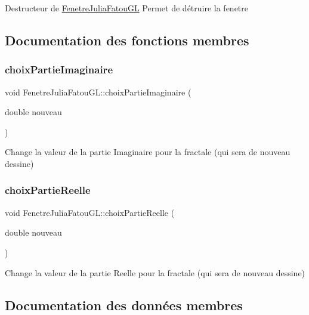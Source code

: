 Destructeur de \hyperlink{classFenetreJuliaFatouGL}{Fenetre\+Julia\+Fatou\+GL} Permet de détruire la fenetre 

\subsection{Documentation des fonctions membres}
\mbox{\label{classFenetreJuliaFatouGL_a73ccd24872ccdf2d9d6a982c0ed44d70}} 
\subsubsection{\texorpdfstring{choix\+Partie\+Imaginaire}{choixPartieImaginaire}}
{\footnotesize\ttfamily void Fenetre\+Julia\+Fatou\+G\+L\+::choix\+Partie\+Imaginaire (\begin{DoxyParamCaption}\item[{double}]{nouveau }\end{DoxyParamCaption})\hspace{0.3cm}{\ttfamily [slot]}}

Change la valeur de la partie Imaginaire pour la fractale (qui sera de nouveau dessine) \mbox{\label{classFenetreJuliaFatouGL_ab7e8e57782d953b9ff196d229f543bec}} 
\subsubsection{\texorpdfstring{choix\+Partie\+Reelle}{choixPartieReelle}}
{\footnotesize\ttfamily void Fenetre\+Julia\+Fatou\+G\+L\+::choix\+Partie\+Reelle (\begin{DoxyParamCaption}\item[{double}]{nouveau }\end{DoxyParamCaption})\hspace{0.3cm}{\ttfamily [slot]}}

Change la valeur de la partie Reelle pour la fractale (qui sera de nouveau dessine) 

\subsection{Documentation des données membres}
\mbox{\label{classFenetreJuliaFatouGL_a212766ae261ef36ff46b50db4e1bff00}} 
